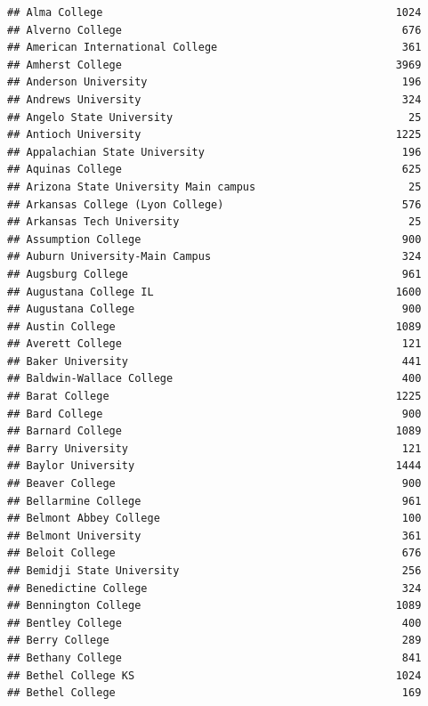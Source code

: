 \documentclass[
]{article}
\begin{document}
\begin{verbatim}
## Alma College                                              1024
## Alverno College                                            676
## American International College                             361
## Amherst College                                           3969
## Anderson University                                        196
## Andrews University                                         324
## Angelo State University                                     25
## Antioch University                                        1225
## Appalachian State University                               196
## Aquinas College                                            625
## Arizona State University Main campus                        25
## Arkansas College (Lyon College)                            576
## Arkansas Tech University                                    25
## Assumption College                                         900
## Auburn University-Main Campus                              324
## Augsburg College                                           961
## Augustana College IL                                      1600
## Augustana College                                          900
## Austin College                                            1089
## Averett College                                            121
## Baker University                                           441
## Baldwin-Wallace College                                    400
## Barat College                                             1225
## Bard College                                               900
## Barnard College                                           1089
## Barry University                                           121
## Baylor University                                         1444
## Beaver College                                             900
## Bellarmine College                                         961
## Belmont Abbey College                                      100
## Belmont University                                         361
## Beloit College                                             676
## Bemidji State University                                   256
## Benedictine College                                        324
## Bennington College                                        1089
## Bentley College                                            400
## Berry College                                              289
## Bethany College                                            841
## Bethel College KS                                         1024
## Bethel College                                             169

\end{verbatim}
\end{document}
